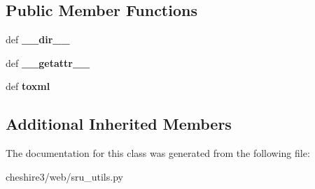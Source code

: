 \subsection*{Public Member Functions}
\begin{DoxyCompactItemize}
\item 
\hypertarget{classcheshire3_1_1web_1_1sru__utils_1_1_sru_record_data_ac5484da6d7660ce36864a5060ab0ac82}{def {\bfseries \-\_\-\-\_\-dir\-\_\-\-\_\-}}\label{classcheshire3_1_1web_1_1sru__utils_1_1_sru_record_data_ac5484da6d7660ce36864a5060ab0ac82}

\item 
\hypertarget{classcheshire3_1_1web_1_1sru__utils_1_1_sru_record_data_a6490c90c3d48562a024e85eabd440ae0}{def {\bfseries \-\_\-\-\_\-getattr\-\_\-\-\_\-}}\label{classcheshire3_1_1web_1_1sru__utils_1_1_sru_record_data_a6490c90c3d48562a024e85eabd440ae0}

\item 
\hypertarget{classcheshire3_1_1web_1_1sru__utils_1_1_sru_record_data_add40c6678f1a9788b69405d749513661}{def {\bfseries toxml}}\label{classcheshire3_1_1web_1_1sru__utils_1_1_sru_record_data_add40c6678f1a9788b69405d749513661}

\end{DoxyCompactItemize}
\subsection*{Additional Inherited Members}


The documentation for this class was generated from the following file\-:\begin{DoxyCompactItemize}
\item 
cheshire3/web/sru\-\_\-utils.\-py\end{DoxyCompactItemize}
